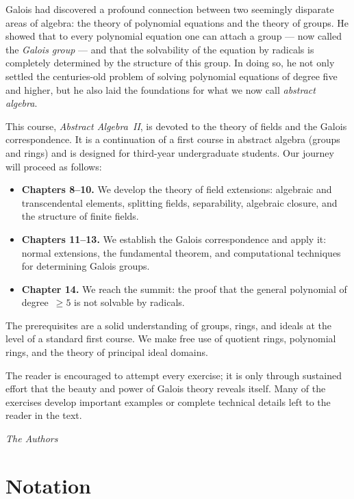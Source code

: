 \documentclass[12pt,a4paper,openany]{book}
\theoremstyle{definition}
\theoremstyle{remark}
\begin{document}
Galois had discovered a profound connection between two seemingly
disparate areas of algebra: the theory of polynomial equations and the
theory of groups. He showed that to every polynomial equation one can
attach a group --- now called the \emph{Galois group} --- and that the solvability of the equation by radicals is
completely determined by the structure of this group. In doing so, he
not only settled the centuries-old problem of solving polynomial
equations of degree five and higher, but he also laid the foundations for
what we now call \emph{abstract algebra}.

This course, \emph{Abstract Algebra~II}, is devoted to the theory of
fields and the Galois correspondence. It is a continuation of a first
course in abstract algebra (groups and rings) and is designed for
third-year undergraduate students. Our journey will proceed as follows:

\begin{itemize}[leftmargin=2em]
  \item \textbf{Chapters 8--10.} We develop the theory of field
    extensions: algebraic and transcendental elements, splitting fields,
    separability, algebraic closure, and the structure of finite fields.
  \item \textbf{Chapters 11--13.} We establish the Galois
    correspondence and apply it: normal extensions, the fundamental
    theorem, and computational techniques for determining Galois groups.
  \item \textbf{Chapter 14.} We reach the summit: the proof that the
    general polynomial of degree~$\ge 5$ is not solvable by radicals.
\end{itemize}

The prerequisites are a solid understanding of groups, rings, and ideals
at the level of a standard first course. We make free use of quotient
rings, polynomial rings, and the theory of principal ideal domains.

The reader is encouraged to attempt every exercise; it is only through
sustained effort that the beauty and power of Galois theory reveals
itself. Many of the exercises develop important examples or complete
technical details left to the reader in the text.

\bigskip
\hfill\textit{The Authors}

\chapter*{Notation}
\end{document}
